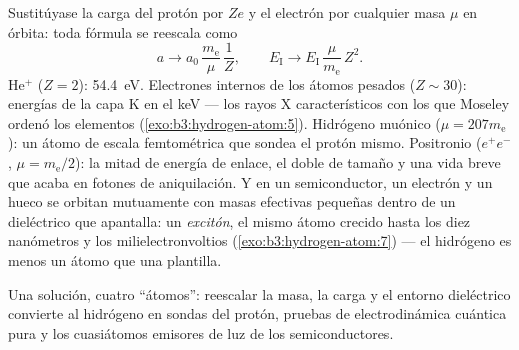 \begin{example}\label{ex:b3:hydrogen-atom:scaling}
Sustitúyase la carga del protón por $Ze$ y el electrón por cualquier masa
$\mu$ en órbita: toda fórmula se reescala como
\[
a \to a_0\,\frac{m_{\text{e}}}{\mu}\,\frac1Z , \qquad
E_{\text{I}} \to E_{\text{I}}\,\frac{\mu}{m_{\text{e}}}\,Z^2 .
\]
He$^+$ ($Z = 2$): \qty{54.4}{eV}. Electrones internos de los átomos pesados
($Z \sim 30$): energías de la capa K en el keV --- los rayos X
característicos con los que Moseley ordenó los elementos
(\cref{exo:b3:hydrogen-atom:5}). Hidrógeno muónico ($\mu = 207
m_{\text{e}}$): un átomo de escala femtométrica que sondea el protón mismo.
Positronio ($e^+e^-$, $\mu = m_{\text{e}}/2$): la mitad de energía de enlace,
el doble de tamaño y una vida breve que acaba en fotones de aniquilación.
Y en un semiconductor, un electrón y un hueco se orbitan mutuamente
con masas efectivas pequeñas dentro de un dieléctrico que apantalla: un
\emph{excitón}, el mismo átomo crecido hasta los diez nanómetros y los
milielectronvoltios (\cref{exo:b3:hydrogen-atom:7}) --- el hidrógeno es
menos un átomo que una plantilla.
\end{example}

\begin{omfigure}

{\small Una solución, cuatro ``átomos'': reescalar la masa, la carga y el
entorno dieléctrico convierte al hidrógeno en sondas del protón, pruebas de
electrodinámica cuántica pura y los cuasiátomos emisores de luz de los
semiconductores.}
\end{omfigure}

